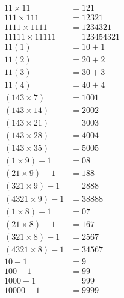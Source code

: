 \begin{align*}
11\times 11 &= 121 \\ %
111 \times 111 &= 12321\\
1111 \times 1111 &= 1234321 \\
11111 \times 11111 &= 123454321\\[0.4cm]
11(1) &= 10+1\\ %
11(2) &= 20+2\\
11(3) &= 30+3\\
11(4) &= 40+4\\[0.4cm]
(143\times 7) &= 1001\\ %
(143 \times 14)&=2002 \\
(143 \times 21) &=3003\\
(143 \times 28) &=4004\\
(143 \times 35) &=5005\\[0.4cm]
(1\times 9) - 1 &= 08\\ %
(21 \times 9) - 1 &= 188\\
(321 \times 9) - 1 &= 2888\\
(4321 \times 9)-1 &= 38888\\[0.4cm]
(1 \times 8) - 1 &= 07\\ %
(21\times 8) - 1 &= 167\\
(321 \times 8)-1 &= 2567\\
(4321 \times 8) -1 &=34567\\[0.4cm]
10-1 &= 9\\ %
100-1 &= 99\\
1000-1 &= 999\\
10000 - 1 &= 9999
\end{align*}
